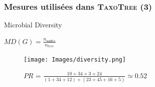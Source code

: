 \documentclass{beamer}
\begin{document}
\begin{frame}
\frametitle{Mesures utilisées dans \textsc{\bf TaxoTree} (3)}

\begin{block}{Microbial Diversity}
\begin{center}
$MD(G) = \frac{n_{nodes}}{n_{tree}}$
\end{center}
\end{block}


\begin{figure}
\centering
\texttt{[image: Images/diversity.png]}
\caption{$PR$ = $\frac{10 + 34 + 3 + 24}{(1 + 34 + 12) + (23 + 45 + 16 + 5)} \simeq 0.52$}
\end{figure}


\end{frame}
\end{document}
